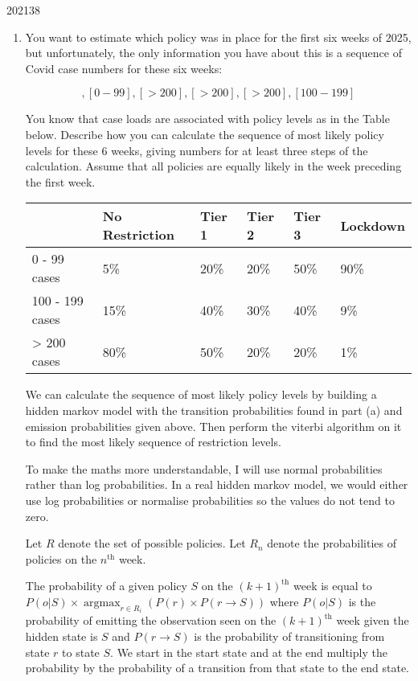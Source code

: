 \documentclass[10pt,\jkfside,a4paper]{article}
\DeclareMathOperator*{\argmax}{argmax}
\begin{document}
\begin{examquestion}{2021}{3}{8}
\begin{enumerate}
\item You want to estimate which policy was in place for the first six weeks of 2025,
but unfortunately, the only information you have about this is a sequence of
Covid case numbers for these six weeks:

\begin{equation}
[0 - 99], [0 - 99], [> 200], [> 200], [> 200], [100 - 199]
\end{equation}

You know that case loads are associated with policy levels as in the Table below.
Describe how you can calculate the sequence of most likely policy levels for these
6 weeks, giving numbers for at least three steps of the calculation. Assume that
all policies are equally likely in the week preceding the first week.

\begin{tabular}{|l|l|l|l|l|l|}
\hline
& No Restriction & Tier 1 & Tier 2 & Tier 3 & Lockdown \\
\hline
0 - 99 cases & 5\% & 20\% & 20\% & 50\% & 90\% \\
100 - 199 cases & 15\% & 40\% & 30\% & 40\% & 9\% \\
> 200 cases & 80\% & 50\% & 20\% & 20\% & 1\% \\
\hline
\end{tabular}

We can calculate the sequence of most likely policy levels by building a hidden markov model with the transition 
probabilities found in part (a) and emission probabilities given above. Then perform the viterbi algorithm 
on it to find the most likely sequence of restriction levels.

To make the maths more understandable, I will use normal probabilities rather than log probabilities. In a 
real hidden markov model, we would either use log probabilities or normalise probabilities so the values 
do not tend to zero.

Let $R$ denote the set of possible policies. Let $R_n$ denote the probabilities of policies on the 
$n^\text{th}$ week.

The probability of a given policy $S$ on the $(k + 1)^\text{th}$ week is equal to $P(o|S)\times \argmax_{r \in R_i}(P(r) \times P(r\rightarrow S))$ 
where $P(o|S)$ is the probability of emitting the observation seen on the $(k + 1)^{\text{th}}$ week given the 
hidden state is $S$ and $P(r \longrightarrow S)$ is the probability of transitioning from state $r$ to state $S$. 
We start in the start state and at the end multiply the probability by the probability of a transition from that 
state to the end state.


\end{enumerate}
\end{examquestion}
\end{document}
